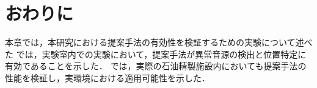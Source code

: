 \documentclass[../main]{subfiles}
\begin{document}
\section{おわりに}
\label{sec:vexp_conclusion}
本章では，本研究における提案手法の有効性を検証するための実験について述べた
では，実験室内での実験において，提案手法が異常音源の検出と位置特定に有効であることを示した．
では，実際の石油精製施設内においても提案手法の性能を検証し，実環境における適用可能性を示した．
\end{document}
